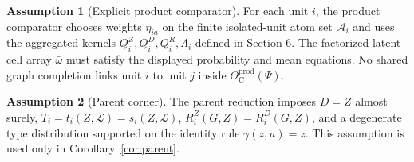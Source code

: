 \documentclass[11pt]{article}
\newcommand{\calA}{\mathcal{A}}
\newcommand{\PsiObs}{\Psi}
\theoremstyle{definition}
\newtheorem{assumption}{Assumption}
\theoremstyle{plain}
\theoremstyle{remark}
\begin{document}
\begin{assumption}[Explicit product comparator]\label{ass:prod}
For each unit \(i\), the product comparator chooses weights
\(\eta_{ia}\) on the finite isolated-unit atom set \(\calA_i\) and uses the
aggregated kernels \(Q_i^Z,Q_i^D,Q_i^R,\Lambda_i\) defined in Section 6. The
factorized latent cell array \(\bar{\omega}\) must satisfy the displayed
probability and mean equations. No shared graph completion links unit \(i\) to
unit \(j\) inside \(\Theta_{\mathrm{C}}^{\mathrm{prod}}(\PsiObs)\).
\end{assumption}

\begin{assumption}[Parent corner]\label{ass:parent-corner}
The parent reduction imposes \(D=Z\) almost surely,
\(T_i=t_i(Z,\mathcal L)=s_i(Z,\mathcal L)\),
\(R_i^Z(G,Z)=R_i^D(G,Z)\), and a degenerate type distribution supported on the
identity rule \(\gamma(z,u)=z\). This assumption is used only in
Corollary~\ref{cor:parent}.
\end{assumption}
\end{document}
